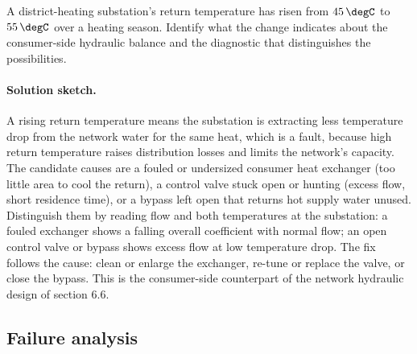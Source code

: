 \begin{exercise}
A district-heating substation's return temperature has risen from
$45\,\degC$ to $55\,\degC$ over a heating season. Identify what the
change indicates about the consumer-side hydraulic balance and the
diagnostic that distinguishes the possibilities.

\paragraph{Solution sketch.} A rising return temperature means the
substation is extracting less temperature drop from the network water
for the same heat, which is a fault, because high return temperature
raises distribution losses and limits the network's capacity. The
candidate causes are a fouled or undersized consumer heat exchanger
(too little area to cool the return), a control valve stuck open or
hunting (excess flow, short residence time), or a bypass left open that
returns hot supply water unused. Distinguish them by reading flow and
both temperatures at the substation: a fouled exchanger shows a falling
overall coefficient with normal flow; an open control valve or bypass
shows excess flow at low temperature drop. The fix follows the cause:
clean or enlarge the exchanger, re-tune or replace the valve, or close
the bypass. This is the consumer-side counterpart of the network
hydraulic design of section 6.6.
\end{exercise}

\subsection*{Failure analysis}

